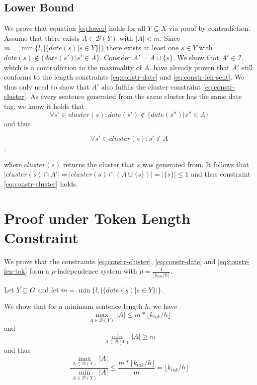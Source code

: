 \documentclass[a4paper,BCOR=10mm]{report}
\numberwithin{lemma}{chapter}
\numberwithin{definition}{chapter}
\begin{document}
\begin{appendices}
\subsection{Lower Bound} \label{sec:proof-date-lower}

We prove that equation \ref{eq:lower} holds for all $Y \subseteq X$ via proof by contradiction.
Assume that there exists $A \in \mathcal{B}(Y)$ with $|A| < m$.
Since $m = \min \{ l, |\{\mathit{date}(s) | s \in Y\}| \}$ there exists at least one $s \in Y$ with $\mathit{date}(s) \not\in \{\mathit{date}(s') | s' \in A\}$.
Consider $A' = A \cup \{ s \}$. We show that $A' \in \mathcal{I}$, which is a contradiction to the maximality of $A$. \citet{markert} have already proven that $A'$ still conforms to the length constraints \ref{eq:constr-date} and \ref{eq:constr-len-sent}.
We thus only need to show that $A'$ also fulfills the cluster constraint \ref{eq:constr-cluster}.
As every sentence generated from the same cluster has the same date tag, we know it holds that
\begin{equation}
\forall s' \in \mathit{cluster}(s): \mathit{date}(s') \not\in \{\mathit{date}(s'') | s'' \in A \}
\end{equation}
and thus

\begin{equation}
\forall s' \in \mathit{cluster}(s) : s' \not\in A
\end{equation},

where $\mathit{cluster}(s)$ returns the cluster that $s$ was generated from.
It follows that $|\mathit{cluster}(s) \cap A'| = |\mathit{cluster}(s) \cap (A \cup \{ s \})| = |\{s\}| \leq 1$ and thus constraint \ref{eq:constr-cluster} holds.


\section{Proof under Token Length Constraint} \label{sec:proof-token-constr}

We prove that the constraints \ref{eq:constr-cluster}, \ref{eq:constr-date} and \ref{eq:constr-len-tok} form a $p$-independence system with $p = \frac{1}{\lfloor k_{tok} / h \rfloor}$.

Let $Y \subseteq G$ and let $m = \min \{ l, |\{\mathit{date}(s) | s \in Y\}| \}$.

We show that for a minimum sentence length $h$, we have 
\begin{equation}
\max_{A \in \mathcal{B}(Y)} |A| \leq m * \lfloor k_{tok} / h \rfloor
\end{equation}
and
\begin{equation}
    \min_{A \in \mathcal{B}(Y)} |A| \geq m
\end{equation}
and thus
\begin{equation}
\frac{\max_{A \in \mathcal{B}(Y)} |A|}{\min_{A \in \mathcal{B}(Y)} |A|}
\leq \frac{m * \lfloor k_{tok} / h \rfloor}{m} = \lfloor k_{tok} / h \rfloor
\end{equation}


\end{appendices}
\end{document}
